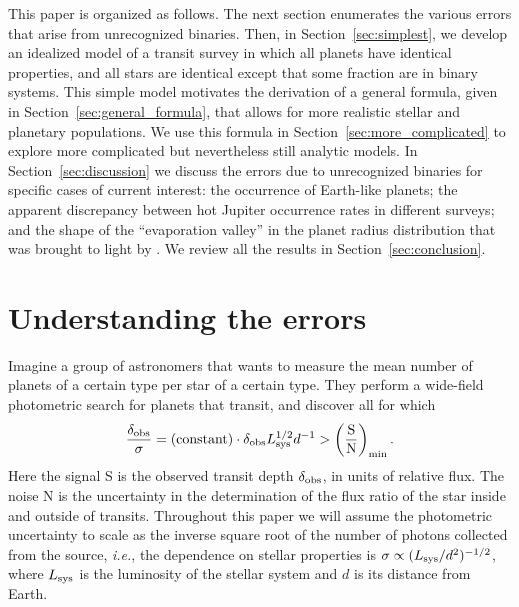 \documentclass[12pt,modern]{aastex61}
\begin{document}
This paper is organized as follows.  The next section enumerates the
various errors that arise from unrecognized binaries.  Then, in
Section~\ref{sec:simplest}, we develop an idealized model of a transit
survey in which all planets have identical properties, and all stars
are identical except that some fraction are in binary systems.  This
simple model motivates the derivation of a general formula, given in
Section~\ref{sec:general_formula}, that allows for more realistic
stellar and planetary populations.  We use this formula in
Section~\ref{sec:more_complicated} to explore more complicated but
nevertheless still analytic models.  In Section~\ref{sec:discussion}
we discuss the errors due to unrecognized binaries for specific cases
of current interest: the occurrence of Earth-like planets; the
apparent discrepancy between hot Jupiter occurrence rates in different
surveys; and the shape of the ``evaporation valley'' in the planet
radius distribution that was brought to light by
\citet{fulton_california-_2017}.  We review all the results in
Section~\ref{sec:conclusion}.


\section{Understanding the errors}
\label{sec:concept}

Imagine a group of astronomers that wants to measure the mean number of
planets of a certain type per star of a certain type.  They perform a
wide-field photometric search for planets that transit, and discover
all for which
\begin{equation}
\frac{\delta_{\rm obs}}{\sigma}
  = ({\rm constant}) \cdot \delta_{\rm obs} L_{\rm sys}^{1/2} d^{-1}
> \left(\frac{{\rm S}}{{\rm N}}\right)_{\rm min}.
\label{eq:S_N_thresh}
\end{equation}
Here the signal S is the observed transit depth $\delta_{\rm obs}$, in
units of relative flux.
The noise N is the uncertainty in the
determination of the flux ratio of the star inside and outside of
transits.  Throughout this paper we will assume the photometric
uncertainty to scale as the inverse square root of the number of
photons collected from the source, {\it i.e.}, the dependence on
stellar properties is $\sigma \propto (L_{\rm sys}/d^2)^{-1/2}$, where
$L_{\rm sys}$ is the luminosity of the stellar system and $d$ is its
distance from Earth.
\end{document}
